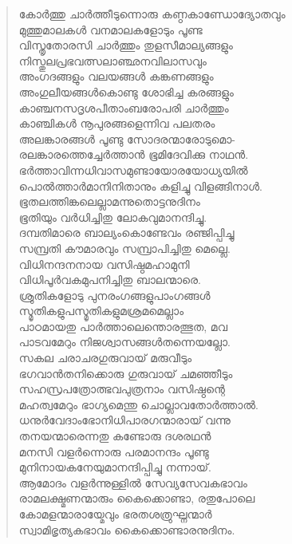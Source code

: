 \begin{verse}
കോര്‍ത്തു ചാര്‍ത്തീടുന്നൊരു കണ്ഠകാണ്ഡോദ്യോതവും\\
മുത്തുമാലകള്‍ വനമാലകളോടും പൂണ്ട\\
വിസ്തൃതോരസി ചാര്‍ത്തും തുളസീമാല്യങ്ങളും\\
നിസ്തുലപ്രഭവത്സലാഞ്ഛനവിലാസവും\\
അംഗദങ്ങളും വലയങ്ങള്‍ കങ്കണങ്ങളും\\
അംഗുലീയങ്ങള്‍കൊണ്ടു ശോഭിച്ച കരങ്ങളും\\
കാഞ്ചനസദൃശപീതാംബരോപരി ചാര്‍ത്തും\\
കാഞ്ചികള്‍ നൂപുരങ്ങളെന്നിവ പലതരം\\
അലങ്കാരങ്ങള്‍ പൂണ്ടു സോദരന്മാരോടുമൊ-\\
രലങ്കാരത്തെച്ചേര്‍ത്താന്‍ ഭൂമിദേവിക്കു നാഥന്‍.\\
ഭര്‍ത്താവിന്നധിവാസമുണ്ടായോരയോധ്യയില്‍\\
പൊല്‍ത്താര്‍മാനിനിതാനും കളിച്ചു വിളങ്ങിനാള്‍.\\
ഭൂതലത്തിങ്കലെല്ലാമന്നുതൊട്ടനുദിനം\\
ഭൂതിയും വര്‍ധിച്ചിതു ലോകവുമാനന്ദിച്ചു.\\
ദമ്പതിമാരെ ബാല്യംകൊണ്ടേവം രഞ്ജിപ്പിച്ചു\\
സമ്പ്രതി കൗമാരവും സമ്പ്രാപിച്ചിതു മെല്ലെ.\\
വിധിനന്ദനനായ വസിഷ്ഠമഹാമുനി\\
വിധിപൂര്‍വകമുപനിച്ചിതു ബാലന്മാരെ.\\
ശ്രുതികളോടു പുനരംഗങ്ങളുപാംഗങ്ങള്‍\\
സ്മൃതികളുപസ്മൃതികളുമശ്രമമെല്ലാം\\
പാഠമായതു പാര്‍ത്താലെന്തൊരത്ഭുത, മവ\\
പാടവമേറും നിജശ്വാസങ്ങള്‍തന്നെയല്ലോ.\\
സകല ചരാചരഗുരുവായ് മരുവീടും\\
ഭഗവാന്‍തനിക്കൊരു ഗുരുവായ് ചമഞ്ഞീടും\\
സഹസ്രപത്രോത്ഭവപുത്രനാം വസിഷ്ഠന്റെ\\
മഹത്വമേറും ഭാഗ്യമെന്തു ചൊല്ലാവതോര്‍ത്താല്‍.\\
ധനുര്‍വേദാംഭോനിധിപാരഗന്മാരായ് വന്നു\\
തനയന്മാരെന്നതു കണ്ടോരു ദശരഥന്‍\\
മനസി വളര്‍ന്നൊരു പരമാനന്ദം പൂണ്ടു\\
മുനിനായകനേയുമാനന്ദിപ്പിച്ചു നന്നായ്.\\
ആമോദം വളര്‍ന്നുള്ളില്‍ സേവ്യസേവകഭാവം\\
രാമലക്ഷ്മണന്മാരും കൈക്കൊണ്ടാ, രതുപോലെ\\
കോമളന്മാരായ്മേവും ഭരതശത്രുഘ്നന്മാര്‍\\
സ്വാമിഭൃത്യകഭാവം കൈക്കൊണ്ടാരനുദിനം.\\

\end{verse}
